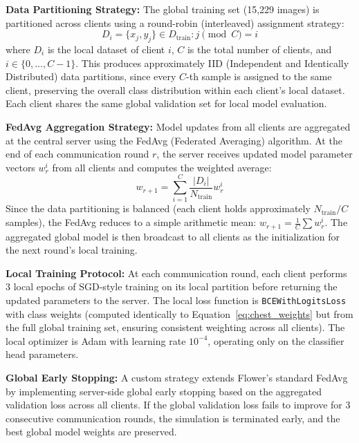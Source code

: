 \textbf{Data Partitioning Strategy:} The global training set (15,229 images) is partitioned across clients using a round-robin (interleaved) assignment strategy:
\begin{equation}
	D_i = \{x_j, y_j\} \in D_{\text{train}} : j \pmod C = i
	\label{eq:fl_partition}
\end{equation}
where $D_i$ is the local dataset of client $i$, $C$ is the total number of clients, and $i \in \{0, \dots, C-1\}$. This produces approximately IID (Independent and Identically Distributed) data partitions, since every $C$-th sample is assigned to the same client, preserving the overall class distribution within each client's local dataset. Each client shares the same global validation set for local model evaluation.

\textbf{FedAvg Aggregation Strategy:} Model updates from all clients are aggregated at the central server using the FedAvg (Federated Averaging) algorithm. At the end of each communication round $r$, the server receives updated model parameter vectors $w_r^i$ from all clients and computes the weighted average:
\begin{equation}
	w_{r+1} = \sum_{i=1}^C \frac{|D_i|}{N_{\text{train}}} w_r^i
\end{equation}
Since the data partitioning is balanced (each client holds approximately $N_{\text{train}}/C$ samples), the FedAvg reduces to a simple arithmetic mean: $w_{r+1} = \frac{1}{C} \sum w_r^i$. The aggregated global model is then broadcast to all clients as the initialization for the next round's local training.

\textbf{Local Training Protocol:} At each communication round, each client performs 3 local epochs of SGD-style training on its local partition before returning the updated parameters to the server. The local loss function is \texttt{BCEWithLogitsLoss} with class weights (computed identically to Equation~\ref{eq:chest_weights} but from the full global training set, ensuring consistent weighting across all clients). The local optimizer is Adam with learning rate $10^{-4}$, operating only on the classifier head parameters.

\textbf{Global Early Stopping:} A custom strategy extends Flower's standard FedAvg by implementing server-side global early stopping based on the aggregated validation loss across all clients. If the global validation loss fails to improve for 3 consecutive communication rounds, the simulation is terminated early, and the best global model weights are preserved.


